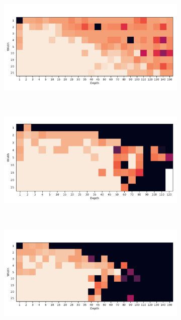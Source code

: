 \begin{figure}[h!]
\begin{subfigure}[b]{0.3\textwidth}
        \caption{\SepUnitPoint}
        \label{fig:moons_grid_up}
    \end{subfigure}
    ~ %
    \\
    \begin{subfigure}[b]{0.3\textwidth}
        \includegraphics[width=\textwidth]{img/moons_grid/acc-sep-u-0-0001.pdf}
        \caption{\SepUnit}
        \label{fig:moons_grid_u}
    \end{subfigure}
    ~ %
    \centering
    \begin{subfigure}[b]{0.3\textwidth}
        \includegraphics[width=\textwidth]{img/moons_grid/acc-sep-p-0-0001.pdf}
        \caption{\SepPoint}
        \label{fig:moons_grid_p}
    \end{subfigure}
    ~ %
    \centering
    \begin{subfigure}[b]{0.3\textwidth}
        \includegraphics[width=\textwidth]{img/moons_grid/acc-sep-l-0-0001.pdf}

\end{subfigure}
\end{figure}
